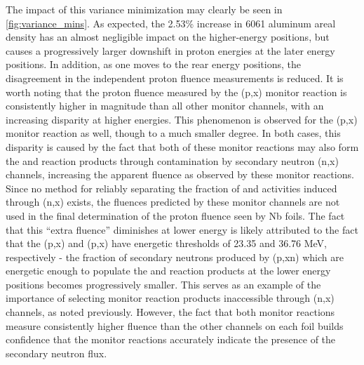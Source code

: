 \documentclass[3p]{elsarticle}
\begin{document}
The impact of this variance minimization may  clearly be seen in   \autoref{fig:variance_mins}.
As expected, the 2.53\% increase in 6061 aluminum areal density has an almost negligible impact on the higher-energy positions, but causes a progressively larger downshift  in proton energies at the later energy positions.
In addition, as one moves to the rear energy positions, the disagreement in the independent proton fluence measurements is reduced.
It is worth noting that the proton fluence measured by the (p,x) monitor reaction is consistently higher in magnitude than all other monitor channels, with an increasing disparity at higher energies.
This phenomenon is observed for the (p,x) monitor reaction as well, though to a much smaller degree.
In both cases, this disparity is caused by the fact that both of these monitor reactions may also form the  and  reaction products through contamination by secondary neutron (n,x) channels, increasing the apparent fluence as observed by these monitor reactions.
Since no method for reliably separating the fraction of  and  activities induced through (n,x) exists, the fluences predicted by these monitor channels are not used in the final determination of the proton fluence seen by Nb foils. 
The fact that this \enquote{extra fluence} diminishes at lower energy is likely attributed to the fact that the (p,x) and (p,x) have energetic thresholds of 23.35 and 36.76 MeV, respectively - the fraction of secondary neutrons produced by (p,xn)  which are energetic enough to populate the   and  reaction products at the lower energy positions becomes progressively smaller.
This serves as an example of the importance of selecting monitor reaction products inaccessible through (n,x) channels, as noted previously.
However,  the fact that both monitor reactions measure consistently higher fluence than the other channels on each foil builds confidence that the monitor reactions accurately indicate the presence of the secondary neutron flux.
\end{document}
